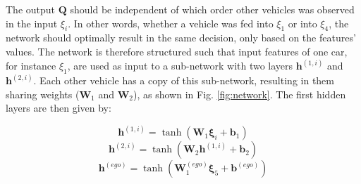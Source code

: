 
The output $\bm{Q}$ should be independent of which order other vehicles was observed in the input $\xi_i$. In other words, whether a vehicle was fed into $\xi_1$ or into $\xi_4$, the network should optimally result in the same decision, only based on the features' values. 
The network is therefore structured such that input features of one car, for instance $\xi_1$, are used as input to a sub-network with two layers $\bm{h}^{(1, i)}$ and $\bm{h}^{(2, i)}$. Each other vehicle has a copy of this sub-network, resulting in them sharing weights ($\bm{W}_1$ and $\bm{W}_2$), as shown in Fig. \ref{fig:network}. The first hidden layers are then given by:

\begin{equation}
\bm{h}^{(1, i)} = \tanh\left(\bm{W}_1 \bm\xi_i + \bm{b}_1\right)
\end{equation}
\begin{equation}
\bm{h}^{(2, i)} = \tanh\left(\bm{W}_2 \bm{h}^{(1, i)} + \bm{b}_2\right)
\end{equation}
\begin{equation}
\bm h^{(ego)}   = \tanh\left(\bm{W}^{(ego)}_{1}  \bm\xi_5 + \bm{b}^{(ego)}\right)
\end{equation}

